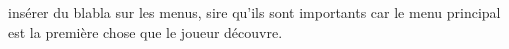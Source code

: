 \documentclass[../doc.tex]{subfiles}
\begin{document}
insérer du blabla sur les menus, sire qu'ils sont importants car le menu
principal est la première chose que le joueur découvre.
\end{document}
